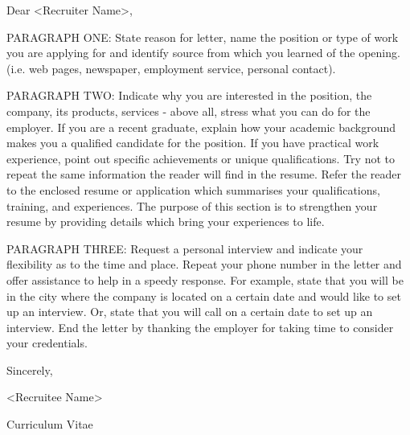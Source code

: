 \documentclass{cv}
\begin{document}
\phantom{}

\vspace{1.5cm}

Dear <Recruiter Name>,

\vspace{1cm}

PARAGRAPH ONE: State reason for letter, name the position
or type of work you are applying for and identify source
from which you learned of the opening. (i.e. web pages, newspaper,
employment service, personal contact).

\vspace{0.5cm}

PARAGRAPH TWO: Indicate why you are interested in the position,
the company, its products, services - above all, stress what you
can do for the employer. If you are a recent graduate, explain
how your academic background makes you a qualified candidate for
the position. If you have practical work experience, point out
specific achievements or unique qualifications. Try not to repeat
the same information the reader will find in the resume. Refer
the reader to the enclosed resume or application which summarises
your qualifications, training, and experiences. The purpose of this
section is to strengthen your resume by providing details which
bring your experiences to life.

\vspace{0.5cm}

PARAGRAPH THREE: Request a personal interview and indicate your
flexibility as to the time and place. Repeat your phone number
in the letter and offer assistance to help in a speedy response.
For example, state that you will be in the city where the company
is located on a certain date and would like to set up an interview.
Or, state that you will call on a certain date to set up an interview.
End the letter by thanking the employer for taking time to consider
your credentials.

\vspace{1.0cm}

Sincerely,

\vspace{0.2cm}

<Recruitee Name>

\vspace{1.0cm}

\faPaperclip \hspace{0.5em} Curriculum Vitae

\end{document}
